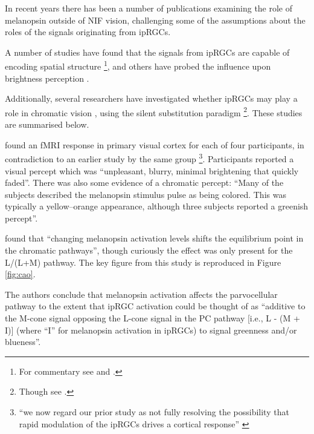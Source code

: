 In recent years there has been a number of publications examining the role of melanopsin outside of \gls{NIF} vision, challenging some of the assumptions about the roles of the signals originating from \glspl{ipRGC}.

A number of studies have found that the signals from ipRGCs are capable of encoding spatial structure \citep{ecker_melanopsin-expressing_2010, mouland_responses_2017, allen_melanopsin_2017, allen_form_2019, zhao_photoresponse_2014}\footnote{For commentary see \citet{spitschan_vision_2017} and \citet{sonoda_re-evaluating_2016}.}, and others have probed the influence upon brightness perception \citep{zele_cone_2018,brown_melanopsin-based_2012}.

Additionally, several researchers have investigated whether \glspl{ipRGC} may play a role in chromatic vision \citep{cao_evidence_2018, spitschan_human_2017-1,zele_melanopsin_2018,horiguchi_human_2013,vincent_adaptation_2019,vincent_adaptation_2019-1}, using the silent substitution paradigm \citep{estevez_silent_1982,spitschan_method_2018}\footnote{Though see \citet{kamar_silent-substitution_2019}.}. These studies are summarised below.

\textbf{\citet{spitschan_human_2017-1}} found an fMRI response in primary visual cortex for each of four participants, in contradiction to an earlier study by the same group \citep{spitschan_human_2016}\footnote{``we now regard our prior study as not fully resolving the possibility that rapid modulation of the ipRGCs drives a cortical response'' \citep{spitschan_human_2017-1}}. Participants reported a visual percept which was ``unpleasant, blurry, minimal brightening that quickly faded''. There was also some evidence of a chromatic percept: ``Many of the subjects described the melanopsin stimulus pulse as being colored. This was typically a yellow–orange appearance, although three subjects reported a greenish percept''.


\textbf{\citet{cao_evidence_2018}} found that ``changing melanopsin activation levels shifts the equilibrium point in the chromatic pathways'', though curiously the effect was only present for the L/(L+M) pathway. The key figure from this study is reproduced in Figure \ref{fig:cao}. 

The authors conclude that melanopsin activation affects the parvocellular pathway to the extent that \gls{ipRGC} activation could be thought of as ``additive to the M-cone signal opposing the L-cone signal in the PC pathway [i.e., L - (M + I)] (where ``I'' for melanopsin activation in ipRGCs) to signal greenness and/or blueness''. 

